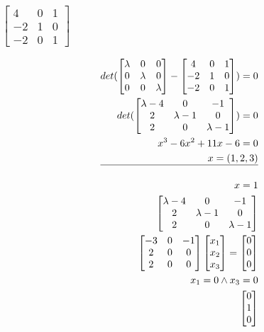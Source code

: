 \documentclass[12pt, a4paper]{article}
\begin{document}
			\subsubsection{$\begin{bmatrix}4&0&1\\-2&1&0\\-2&0&1\end{bmatrix}$}
				\begin{align*}
					det(\begin{bmatrix}\lambda & 0 & 0\\0&\lambda & 0\\ 0 & 0 & \lambda\end{bmatrix}-\begin{bmatrix}4&0&1\\-2&1&0\\-2&0&1\end{bmatrix})=0\\
					det(\begin{bmatrix}\lambda-4&0&-1\\2&\lambda-1&0\\2&0&\lambda-1\end{bmatrix})=0\\
					x^3-6x^2+11x-6=0\\
					x=(1,2,3)\\
					\hline\\
					x=1\\
					\begin{bmatrix}\lambda-4&0&-1\\2&\lambda-1&0\\2&0&\lambda-1\end{bmatrix}\\
					\begin{bmatrix}-3&0&-1\\2&0&0\\2&0&0\end{bmatrix}\begin{bmatrix}x_1\\x_2\\x_3\end{bmatrix}=\begin{bmatrix}0\\0\\0\end{bmatrix}\\
					x_1=0\land x_3=0\\
					\begin{bmatrix}0\\1\\0\end{bmatrix}\\

\end{align*}
\end{document}
